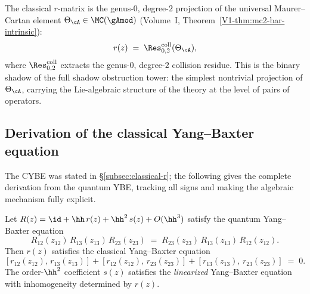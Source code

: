 \begin{remark}
The classical $r$-matrix is the genus-$0$, degree-$2$ projection of
the universal Maurer--Cartan element $\Theta_\cA \in
\MC(\gAmod)$ (Volume~I, Theorem~\ref*{V1-thm:mc2-bar-intrinsic}):
\begin{equation}
r(z) \;=\; \Res^{\mathrm{coll}}_{0,2}(\Theta_\cA),
\end{equation}
where $\Res^{\mathrm{coll}}_{0,2}$ extracts the genus-$0$,
degree-$2$ collision residue. This is the binary shadow of the
full shadow obstruction tower: the simplest nontrivial projection
of $\Theta_\cA$, carrying the Lie-algebraic structure of the
theory at the level of pairs of operators.
\end{remark}

\subsection{Derivation of the classical Yang--Baxter equation}

The CYBE was stated in \S\ref{subsec:classical-r}; the following gives the
complete derivation from the quantum YBE, tracking all signs and
making the algebraic mechanism fully explicit.

\begin{theorem}
Let $R(z) = \id + \hh\, r(z) + \hh^2\, s(z) + O(\hh^3)$ satisfy the
quantum Yang--Baxter equation
\begin{equation}
R_{12}(z_{12})\, R_{13}(z_{13})\, R_{23}(z_{23})
\;=\;
R_{23}(z_{23})\, R_{13}(z_{13})\, R_{12}(z_{12}).
\end{equation}
Then $r(z)$ satisfies the classical Yang--Baxter equation
\begin{equation}
\boxed{
[r_{12}(z_{12}),\, r_{13}(z_{13})]
+ [r_{12}(z_{12}),\, r_{23}(z_{23})]
+ [r_{13}(z_{13}),\, r_{23}(z_{23})]
\;=\; 0.
}
\end{equation}
The order-$\hh^2$ coefficient $s(z)$ satisfies the
\emph{linearized} Yang--Baxter equation with inhomogeneity determined
by $r(z)$.
\end{theorem}

